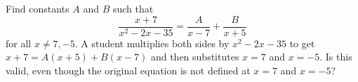 Find constants $A$ and $B$ such that
\[\dfrac{x+7}{x^2-2x-35}=\dfrac{A}{x-7}+\dfrac{B}{x+5}\]
for all $x\ne7,-5$. A student multiplies both sides by $x^2-2x-35$ to get $x+7=A(x+5)+B(x-7)$ and then substitutes $x=7$ and $x=-5$. Is this valid, even though the original equation is not defined at $x=7$ and $x=-5$?
